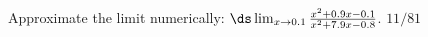 {Approximate  the limit numerically: 
$\ds \lim_{x\to 0.1} \frac{x^2+0.9 x-0.1}{x^2+7.9 x-0.8}$.
}
{$11/81$
}


